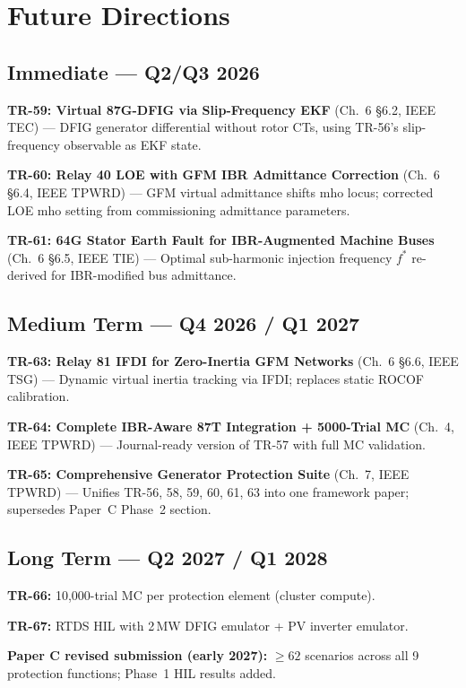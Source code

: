 \documentclass[11pt,a4paper]{article}
\begin{document}
\newpage
\section{Future Directions}

\subsection{Immediate — Q2/Q3 2026}

\textbf{TR-59: Virtual 87G-DFIG via Slip-Frequency EKF}
(Ch.\ 6 \S6.2, IEEE TEC) — DFIG generator differential without rotor CTs,
using TR-56's slip-frequency observable as EKF state.

\textbf{TR-60: Relay 40 LOE with GFM IBR Admittance Correction}
(Ch.\ 6 \S6.4, IEEE TPWRD) — GFM virtual admittance shifts mho locus; corrected
LOE mho setting from commissioning admittance parameters.

\textbf{TR-61: 64G Stator Earth Fault for IBR-Augmented Machine Buses}
(Ch.\ 6 \S6.5, IEEE TIE) — Optimal sub-harmonic injection frequency $f^*$
re-derived for IBR-modified bus admittance.

\subsection{Medium Term — Q4 2026 / Q1 2027}

\textbf{TR-63: Relay 81 IFDI for Zero-Inertia GFM Networks}
(Ch.\ 6 \S6.6, IEEE TSG) — Dynamic virtual inertia tracking via IFDI;
replaces static ROCOF calibration.

\textbf{TR-64: Complete IBR-Aware 87T Integration + 5000-Trial MC}
(Ch.\ 4, IEEE TPWRD) — Journal-ready version of TR-57 with full MC validation.

\textbf{TR-65: Comprehensive Generator Protection Suite}
(Ch.\ 7, IEEE TPWRD) — Unifies TR-56, 58, 59, 60, 61, 63 into one framework
paper; supersedes Paper~C Phase~2 section.

\subsection{Long Term — Q2 2027 / Q1 2028}

\textbf{TR-66:} 10,000-trial MC per protection element (cluster compute).

\textbf{TR-67:} RTDS HIL with 2\,MW DFIG emulator + PV inverter emulator.

\textbf{Paper C revised submission (early 2027):}
$\geq 62$ scenarios across all 9 protection functions; Phase~1 HIL results added.
\end{document}
